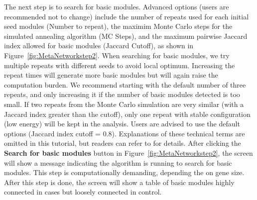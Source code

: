 \begin{steps}
The next step is to search for basic modules.
Advanced options (users are recommended not to change) 
include the number of repeats used for each initial seed modules (Number to repeat),
the maximim Monte Carlo steps for the simulated annealing algorithm (MC Steps),
and the maximum pairwise Jaccard index allowed for basic modules (Jaccard Cutoff), as shown in Figure~\ref{fig:MetaNetworkstep2}.
When searching for basic modules, 
we try multiple repeats with different seeds to avoid local optimum. 
Increasing the repeat times will generate more basic modules but will again raise the computation burden. 
We recommend starting with the default number of three repeats, 
and only increasing it if the number of basic modules detected is too small.
If two repeats from the Monte Carlo simulation are very similar (with a Jaccard index greater than the cutoff),
only one repeat with stable configuration (low energy) will be kept in the analysis.
Users are advised to use the default options (Jaccard index cutoff = 0.8).
Explanations of these technical terms are omitted in this tutorial,
but readers can refer to \cite{zhu2016metadcn} for details.
After clicking the \textbf{Search for basic modules} button in Figure~\ref{fig:MetaNetworkstep2}, 
the screen will show a message indicating the algorithm is running to search for basic modules.
This step is computationally demanding, depending the on gene size.
After this step is done,
the screen will show a table of basic modules highly connected in cases but loosely connected in control.



\end{steps}
